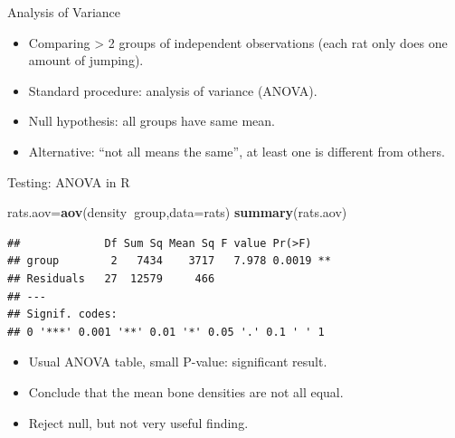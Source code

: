 \documentclass[
  ignorenonframetext,
]{beamer}
\newenvironment{Shaded}{\begin{snugshade}}{\end{snugshade}}
\newcommand{\DataTypeTok}[1]{\textcolor[rgb]{0.13,0.29,0.53}{#1}}
\newcommand{\KeywordTok}[1]{\textcolor[rgb]{0.13,0.29,0.53}{\textbf{#1}}}
\newcommand{\NormalTok}[1]{#1}
\newcommand{\OperatorTok}[1]{\textcolor[rgb]{0.81,0.36,0.00}{\textbf{#1}}}
\providecommand{\tightlist}{%
  \setlength{\itemsep}{0pt}\setlength{\parskip}{0pt}}
\begin{document}
\begin{frame}{Analysis of Variance}
\protect\hypertarget{analysis-of-variance}{}

\begin{itemize}
\tightlist
\item
  Comparing \textgreater{} 2 groups of independent observations (each
  rat only does one amount of jumping).
\item
  Standard procedure: analysis of variance (ANOVA).
\item
  Null hypothesis: all groups have same mean.
\item
  Alternative: ``not all means the same'', at least one is different
  from others.
\end{itemize}

\end{frame}

\begin{frame}[fragile]{Testing: ANOVA in R}
\protect\hypertarget{testing-anova-in-r}{}

\begin{Shaded}
\begin{Highlighting}[]
\NormalTok{rats.aov=}\KeywordTok{aov}\NormalTok{(density}\OperatorTok{~}\NormalTok{group,}\DataTypeTok{data=}\NormalTok{rats)}
\KeywordTok{summary}\NormalTok{(rats.aov)}
\end{Highlighting}
\end{Shaded}

\begin{verbatim}
##             Df Sum Sq Mean Sq F value Pr(>F)   
## group        2   7434    3717   7.978 0.0019 **
## Residuals   27  12579     466                  
## ---
## Signif. codes:  
## 0 '***' 0.001 '**' 0.01 '*' 0.05 '.' 0.1 ' ' 1
\end{verbatim}

\begin{itemize}
\tightlist
\item
  Usual ANOVA table, small P-value: significant result.
\item
  Conclude that the mean bone densities are not all equal.
\item
  Reject null, but not very useful finding.
\end{itemize}

\end{frame}
\end{document}
